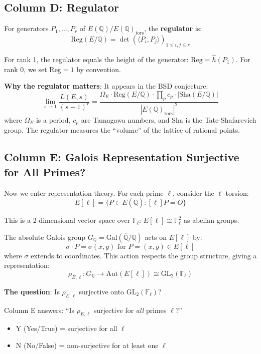 \documentclass[11pt]{article}
\begin{document}
\subsection{Column D: Regulator}

For generators $P_1, \ldots, P_r$ of $E(\mathbb{Q})/E(\mathbb{Q})_{\text{tors}}$, the \textbf{regulator} is:
$$\text{Reg}(E/\mathbb{Q}) = \det\left(\langle P_i, P_j \rangle\right)_{1 \leq i,j \leq r}$$

For rank 1, the regulator equals the height of the generator: $\text{Reg} = \hat{h}(P_1)$. For rank 0, we set $\text{Reg} = 1$ by convention.

\textbf{Why the regulator matters}: It appears in the BSD conjecture:
$$\lim_{s \to 1} \frac{L(E, s)}{(s-1)^r} = \frac{\Omega_E \cdot \text{Reg}(E/\mathbb{Q}) \cdot \prod_p c_p \cdot |\text{Sha}(E/\mathbb{Q})|}{|E(\mathbb{Q})_{\text{tors}}|^2}$$
where $\Omega_E$ is a period, $c_p$ are Tamagawa numbers, and $\text{Sha}$ is the Tate-Shafarevich group. The regulator measures the ``volume'' of the lattice of rational points.

\subsection{Column E: Galois Representation Surjective for All Primes?}

Now we enter representation theory. For each prime $\ell$, consider the $\ell$-torsion:
$$E[\ell] = \{P \in E(\overline{\mathbb{Q}}) : [\ell]P = O\}$$

This is a 2-dimensional vector space over $\mathbb{F}_\ell$: $E[\ell] \cong \mathbb{F}_\ell^2$ as abelian groups.

The absolute Galois group $G_{\mathbb{Q}} = \text{Gal}(\overline{\mathbb{Q}}/\mathbb{Q})$ acts on $E[\ell]$ by:
$$\sigma \cdot P = \sigma(x, y) \text{ for } P = (x, y) \in E[\ell]$$
where $\sigma$ extends to coordinates. This action respects the group structure, giving a representation:
$$\rho_{E,\ell}: G_{\mathbb{Q}} \to \text{Aut}(E[\ell]) \cong \text{GL}_2(\mathbb{F}_\ell)$$

\textbf{The question}: Is $\rho_{E,\ell}$ surjective onto $\text{GL}_2(\mathbb{F}_\ell)$?

Column E answers: ``Is $\rho_{E,\ell}$ surjective for \emph{all} primes $\ell$?'' 
\begin{itemize}
\item Y (Yes/True) = surjective for all $\ell$
\item N (No/False) = non-surjective for at least one $\ell$
\end{itemize}
\end{document}
